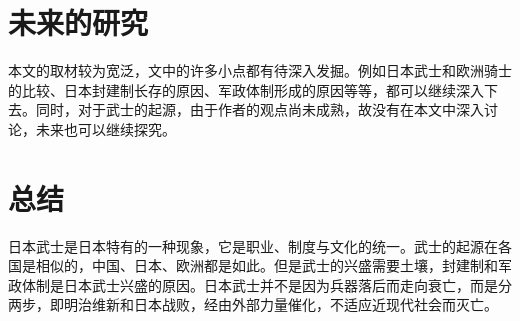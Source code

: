 \documentclass[utf8,a4paper]{ctexart}
\begin{document}
\section{未来的研究}
本文的取材较为宽泛，文中的许多小点都有待深入发掘。例如日本武士和欧洲骑士的比较、日本封建制长存的原因、军政体制形成的原因等等，都可以继续深入下去。同时，对于武士的起源，由于作者的观点尚未成熟，故没有在本文中深入讨论，未来也可以继续探究。

\section{总结}
日本武士是日本特有的一种现象，它是职业、制度与文化的统一。武士的起源在各国是相似的，中国、日本、欧洲都是如此。但是武士的兴盛需要土壤，封建制和军政体制是日本武士兴盛的原因。日本武士并不是因为兵器落后而走向衰亡，而是分两步，即明治维新和日本战败，经由外部力量催化，不适应近现代社会而灭亡。




\newpage
\end{document}
